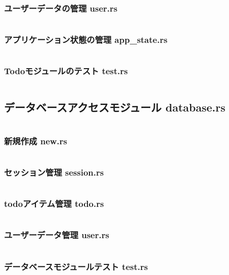 \documentclass[paper=a4paper, fontsize=10pt, head_space=10mm, foot_space=17mm, gutter=17mm, line_length=185mm, twoside]{jlreq}
\begin{document}
\subsubsection{ユーザーデータの管理 user.rs}
\inputminted[linenos, breaklines]{rust}{src-rs/todo/user.rs}
\clearpage

\subsubsection{アプリケーション状態の管理 app\_state.rs}
\inputminted[linenos, breaklines]{rust}{src-rs/todo/app_state.rs}
\clearpage

\subsubsection{Todoモジュールのテスト test.rs}
\inputminted[linenos, breaklines]{rust}{src-rs/todo/test.rs}
\clearpage

\subsection{データベースアクセスモジュール database.rs}
\inputminted[linenos, breaklines]{rust}{src-rs/database.rs}
\clearpage

\subsubsection{新規作成 new.rs}
\inputminted[linenos, breaklines]{rust}{src-rs/database/new.rs}
\clearpage

\subsubsection{セッション管理 session.rs}
\inputminted[linenos, breaklines]{rust}{src-rs/database/session.rs}
\clearpage

\subsubsection{todoアイテム管理 todo.rs}
\inputminted[linenos, breaklines]{rust}{src-rs/database/todo.rs}
\clearpage

\subsubsection{ユーザーデータ管理 user.rs}
\inputminted[linenos, breaklines]{rust}{src-rs/database/user.rs}
\clearpage

\subsubsection{データベースモジュールテスト test.rs}
\inputminted[linenos, breaklines]{rust}{src-rs/database/test.rs}
\clearpage
\end{document}

